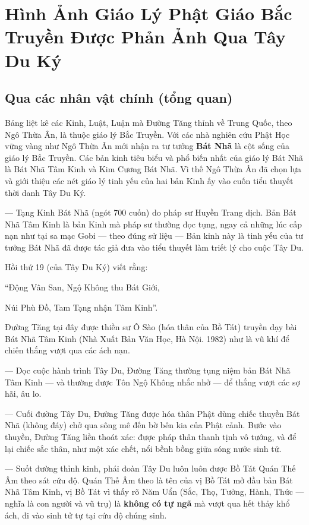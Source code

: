 \chapter{Hình Ảnh Giáo Lý Phật Giáo Bắc Truyền Được Phản Ảnh Qua Tây Du Ký} %
\label{cha:hinh_anh_giao_ly_phat_giao_bac_truyen}

\section{Qua các nhân vật chính (tổng quan)} %
\label{sec:qua_cac_nhan_vat_chinh}

Bảng liệt kê các Kinh, Luật, Luận mà Đường Tăng thỉnh về Trung Quốc, theo Ngô Thừa Ân, là thuộc giáo lý Bắc Truyền. Với các nhà nghiên cứu Phật Học vững vàng như Ngô Thừa Ân mới nhận ra tư tưởng {\bf Bát Nhã} là cột sống của giáo lý Bắc Truyền. Các bản kinh tiêu biểu và phổ biến nhất của giáo lý Bát Nhã là Bát Nhã Tâm Kinh và Kim Cương Bát Nhã. Vì thế Ngô Thừa Ân đã chọn lựa và giới thiệu các nét giáo lý tinh yếu của hai bản Kinh ấy vào cuốn tiểu thuyết thời danh Tây Du Ký.

— Tạng Kinh Bát Nhã (ngót 700 cuốn) do pháp sư Huyền Trang dịch. Bản Bát Nhã Tâm Kinh là bản Kinh mà pháp sư thường đọc tụng, ngay cả những lúc cấp nạn như tại sa mạc Gobi — theo đúng sử liệu — Bản kinh này là tinh yếu của tư tưởng Bát Nhã đã được tác giả đưa vào tiểu thuyết làm triết lý cho cuộc Tây Du.

Hồi thứ 19 (của Tây Du Ký) viết rằng:

\begin{itshape}
``Động Vân San, Ngộ Không thu Bát Giới,

Núi Phù Đồ, Tam Tạng nhận Tâm Kinh''.
\end{itshape}

Đường Tăng tại đây được thiền sư Ô Sào (hóa thân của Bồ Tát) truyền dạy bài Bát Nhã Tâm Kinh (Nhà Xuất Bản Văn Học, Hà Nội. 1982) như là vũ khí để chiến thắng vượt qua các ách nạn.

— Dọc cuộc hành trình Tây Du, Đường Tăng thường tụng niệm bản Bát Nhã Tâm Kinh — và thường được Tôn Ngộ Không nhắc nhở — để thắng vượt các sợ hãi, âu lo.

— Cuối đường Tây Du, Đường Tăng được hóa thân Phật dùng chiếc thuyền Bát Nhã (không đáy) chở qua sông mê đến bờ bên kia của Phật cảnh. Bước vào thuyền, Đường Tăng liền thoát xác: được pháp thân thanh tịnh vô tướng, và để lại chiếc sắc thân, như một xác chết, nổi bềnh bồng giữa sóng nước sinh tử.

— Suốt đường thỉnh kinh, phái đoàn Tây Du luôn luôn được Bồ Tát Quán Thế Âm theo sát cứu độ. Quán Thế Âm theo là tên của vị Bồ Tát mở đầu bản Bát Nhã Tâm Kinh, vị Bồ Tát vì thấy rõ Năm Uẩn (Sắc, Thọ, Tưởng, Hành, Thức — nghĩa là con người và vũ trụ) là {\bf không có tự ngã} mà vượt qua hết thảy khổ ách, đi vào sinh tử tự tại cứu độ chúng sinh.

